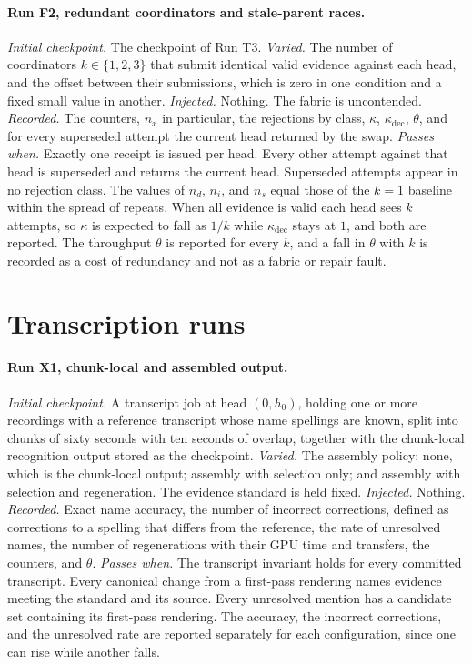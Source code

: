 \documentclass[11pt,openany]{book}
\theoremstyle{remark}
\begin{document}
\paragraph{Run F2, redundant coordinators and stale-parent races.} \emph{Initial checkpoint.} The checkpoint of Run T3. \emph{Varied.} The number of coordinators $k\in\{1,2,3\}$ that submit identical valid evidence against each head, and the offset between their submissions, which is zero in one condition and a fixed small value in another. \emph{Injected.} Nothing. The fabric is uncontended. \emph{Recorded.} The counters, $n_x$ in particular, the rejections by class, $\kappa$, $\kappa_{\mathrm{dec}}$, $\theta$, and for every superseded attempt the current head returned by the swap. \emph{Passes when.} Exactly one receipt is issued per head. Every other attempt against that head is superseded and returns the current head. Superseded attempts appear in no rejection class. The values of $n_d$, $n_i$, and $n_s$ equal those of the $k=1$ baseline within the spread of repeats. When all evidence is valid each head sees $k$ attempts, so $\kappa$ is expected to fall as $1/k$ while $\kappa_{\mathrm{dec}}$ stays at $1$, and both are reported. The throughput $\theta$ is reported for every $k$, and a fall in $\theta$ with $k$ is recorded as a cost of redundancy and not as a fabric or repair fault.

\section{Transcription runs}

\paragraph{Run X1, chunk-local and assembled output.} \emph{Initial checkpoint.} A transcript job at head $(0,h_0)$, holding one or more recordings with a reference transcript whose name spellings are known, split into chunks of sixty seconds with ten seconds of overlap, together with the chunk-local recognition output stored as the checkpoint. \emph{Varied.} The assembly policy: none, which is the chunk-local output; assembly with selection only; and assembly with selection and regeneration. The evidence standard is held fixed. \emph{Injected.} Nothing. \emph{Recorded.} Exact name accuracy, the number of incorrect corrections, defined as corrections to a spelling that differs from the reference, the rate of unresolved names, the number of regenerations with their GPU time and transfers, the counters, and $\theta$. \emph{Passes when.} The transcript invariant holds for every committed transcript. Every canonical change from a first-pass rendering names evidence meeting the standard and its source. Every unresolved mention has a candidate set containing its first-pass rendering. The accuracy, the incorrect corrections, and the unresolved rate are reported separately for each configuration, since one can rise while another falls.
\end{document}
